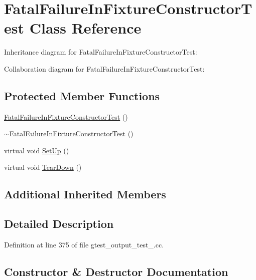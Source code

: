 \hypertarget{class_fatal_failure_in_fixture_constructor_test}{}\section{Fatal\+Failure\+In\+Fixture\+Constructor\+Test Class Reference}
\label{class_fatal_failure_in_fixture_constructor_test}


Inheritance diagram for Fatal\+Failure\+In\+Fixture\+Constructor\+Test\+:


Collaboration diagram for Fatal\+Failure\+In\+Fixture\+Constructor\+Test\+:
\subsection*{Protected Member Functions}
\begin{DoxyCompactItemize}
\item 
\hyperlink{class_fatal_failure_in_fixture_constructor_test_a1dc9a5fcf0e1f22d614990a0fe2cb504}{Fatal\+Failure\+In\+Fixture\+Constructor\+Test} ()
\item 
\hyperlink{class_fatal_failure_in_fixture_constructor_test_a514709af7159172a12193a7508683c46}{$\sim$\+Fatal\+Failure\+In\+Fixture\+Constructor\+Test} ()
\item 
virtual void \hyperlink{class_fatal_failure_in_fixture_constructor_test_a006d3ac0e7a4ad3c469c3b41dc7c42c3}{Set\+Up} ()
\item 
virtual void \hyperlink{class_fatal_failure_in_fixture_constructor_test_a2763026a557e1fce4e59bd16c4eced57}{Tear\+Down} ()
\end{DoxyCompactItemize}
\subsection*{Additional Inherited Members}


\subsection{Detailed Description}


Definition at line 375 of file gtest\+\_\+output\+\_\+test\+\_\+.\+cc.



\subsection{Constructor \& Destructor Documentation}

